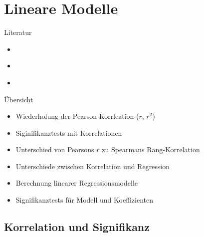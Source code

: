 \section[LMs]{Lineare Modelle}


\begin{frame}
  {Literatur}
  \begin{itemize}
    \item \cite{GravetterWallnau2007}
    \item \cite{ZuurEa2009}
    \item \cite{MaxwellDelaney2004}
  \end{itemize}
\end{frame}

\begin{frame}
  {Übersicht}
  \begin{itemize}[<+->]
    \item Wiederholung der Pearson-Korrleation ($r$, $r^2$)
    \item Siginifikanztests mit Korrelationen
    \item Unterschied von Pearsons $r$ zu Spearmans Rang-Korrelation
    \item Unterschiede zwischen Korrelation und Regression
    \item Berechnung linearer Regressionsmodelle
    \item Signifikanztests für Modell und Koeffizienten
  \end{itemize}
\end{frame}

\subsection{Korrelation und Signifikanz}

